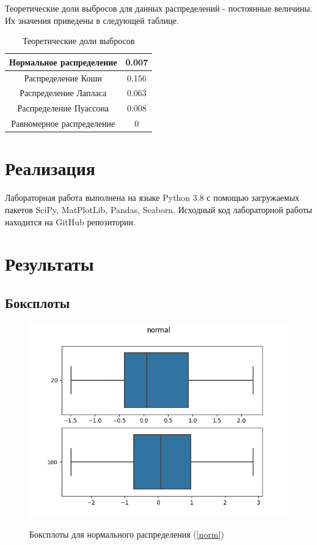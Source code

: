 \documentclass[12pt,a4paper]{article}
\begin{document}
			Теоретические доли выбросов для данных распределений - постоянные величины. Их значения приведены в следующей таблице.
			\begin{table}[h]
				\label{theoretical_outburst}
				\begin{center}
					\begin{tabular}{|c|c|}
						\hline
						Нормальное распределение & 0.007 \\ \hline
						Распределение Коши & 0.156 \\ \hline
						Распределение Лапласа & 0.063 \\ \hline
						Распределение Пуассона & 0.008 \\ \hline
						Равномерное распределение & 0 \\ \hline
					\end{tabular}
				\end{center}
			\caption{Теоретические доли выбросов}
			\end{table}
			
	\newpage
	
	\section{Реализация}
	Лабораторная работа выполнена на языке Python 3.8 с помощью загружаемых пакетов SciPy, MatPlotLib, Pandas, Seaborn. Исходный код лабораторной работы находится на GitHub репозитории.
	\newpage
	
	\section{Результаты}
		\subsection{Боксплоты}
			\begin{figure}[htp]
				{\includegraphics[width=1\linewidth]{../plots/normal.png}}
				\caption{Боксплоты для нормального распределения (\ref{norm})}
			\end{figure}
			\newpage
		
\end{document}
